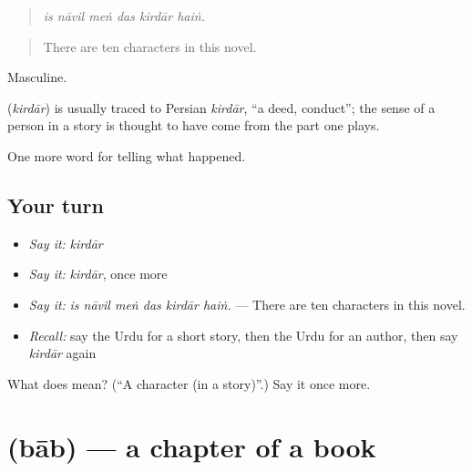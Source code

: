 \begin{quote}
     
\end{quote}

\begin{quote}
\emph{is nāvil meṅ das kirdār haiṅ.}
\end{quote}

\begin{quote}
There are ten characters in this novel.
\end{quote}

Masculine.

\begin{cousinweb}
\textbf{} (\emph{kirdār}) is usually traced to Persian \emph{kirdār}, \textquotedblleft{}a deed, conduct\textquotedblright{}; the sense of a person in a story is thought to have come from the part one plays.
\end{cousinweb}

\begin{grammarlens}[title={What you've built}]
One more word for telling what happened.
\end{grammarlens}

\subsection*{Your turn}
\begin{itemize}
\raggedright
  \item \emph{Say it:} \emph{kirdār}
  \item \emph{Say it:} \emph{kirdār}, once more
  \item \emph{Say it:} \emph{is nāvil meṅ das kirdār haiṅ.} — There are ten characters in this novel.
  \item \emph{Recall:} say the Urdu for a short story, then the Urdu for an author, then say \emph{kirdār} again
\end{itemize}

\begin{tcolorbox}[breakable,colback=teal!4,colframe=teal!35!black,title={Before you move on}]
What does  mean? (\textquotedblleft{}A character (in a story)\textquotedblright{}.) Say it once more.
\end{tcolorbox}
\section[\texorpdfstring{\ur{باب} (bāb)}{باب (bāb)}]{ (bāb) — a chapter of a book}

